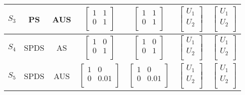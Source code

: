 \begin{table}
\begin{center}
{\begin{tabular}{|c|c|c|c|c|c|c|}
$S_3$   &PS          & AUS   &$\begin{bmatrix} 1 & 1 \\ 0 &1\\\end{bmatrix}$ &$\begin{bmatrix} 1 & 1 \\ 0 &1\\\end{bmatrix}$ &$\begin{bmatrix} U_1 \\ U_2\\\end{bmatrix}$ &$\begin{bmatrix} U_1 \\ U_2\\\end{bmatrix}$ \\ \hline
$S_4$   &SPDS          & AS   &$\begin{bmatrix} 1 & 0 \\ 0 &1\\\end{bmatrix}$ &$\begin{bmatrix} 1 & 0 \\ 0 &1\\\end{bmatrix}$ &$\begin{bmatrix} U_1 \\ U_2\\\end{bmatrix}$ &$\begin{bmatrix} U_1 \\ U_2\\\end{bmatrix}$ \\ \hline
$S_5$   &SPDS          & AUS   &$\begin{bmatrix} 1 & 0 \\ 0 &0.01\\\end{bmatrix}$ &$\begin{bmatrix} 1 & 0 \\ 0 &0.01\\\end{bmatrix}$ &$\begin{bmatrix} U_1 \\ U_2\\\end{bmatrix}$ &$\begin{bmatrix} U_1 \\ U_2\\\end{bmatrix}$ \\ \hline

\end{tabular}}
\end{center}
\end{table}
